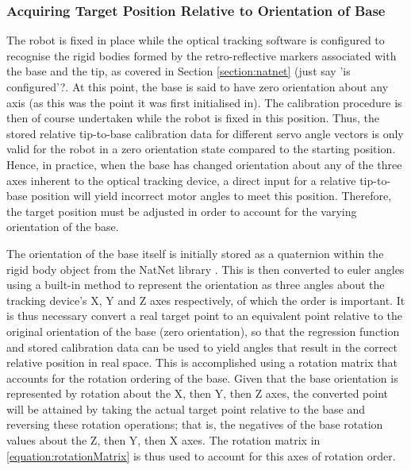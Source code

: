 \documentclass[11pt]{article}
\begin{document}
\subsubsection{Acquiring Target Position Relative to Orientation of Base}
The robot is fixed in place while the optical tracking software is configured to recognise the rigid bodies formed by the retro-reflective markers associated with the base and the tip, as covered in Section \ref{section:natnet} (just say 'is configured'?. At this point, the base is said to have zero orientation about any axis (as this was the point it was first initialised in). The calibration procedure is then of course undertaken while the robot is fixed in this position. Thus, the stored relative tip-to-base calibration data for different servo angle vectors is only valid for the robot in a zero orientation state compared to the starting position. Hence, in practice, when the base has changed orientation about any of the three axes inherent to the optical tracking device, a direct input for a relative tip-to-base position will yield incorrect motor angles to meet this position. Therefore, the target position must be adjusted in order to account for the varying orientation of the base.

The orientation of the base itself is initially stored as a quaternion within the rigid body object from the NatNet library \cite{natnet2016}. This is then converted to euler angles using a built-in method to represent the orientation as three angles about the tracking device's X, Y and Z axes respectively, of which the order is important. It is thus necessary convert a real target point to an equivalent point relative to the original orientation of the base (zero orientation), so that the regression function and stored calibration data can be used to yield angles that result in the correct relative position in real space. This is accomplished using a rotation matrix that accounts for the rotation ordering of the base. Given that the base orientation is represented by rotation about the X, then Y, then Z axes, the converted point will be attained by taking the actual target point relative to the base and reversing these rotation operations; that is, the negatives of the base rotation values about the Z, then Y, then X axes. The rotation matrix in \eqref{equation:rotationMatrix} is thus used to account for this axes of rotation order. 
\end{document}
